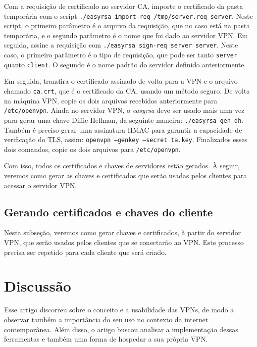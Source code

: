 \documentclass[12pt]{article}
\begin{document}
\begin{flushleft}
Com a requisição de certificado no servidor CA, importe o certificado da pasta temporária com o script 
\texttt{./easyrsa import-req /tmp/server.req server}. Neste script, o primeiro parâmetro é o arquivo da requisição,
que no caso está na pasta temporária, e o segundo parâmetro é o nome que foi dado ao servidor VPN. Em seguida,
assine a requisição com \texttt{./easyrsa sign-req server server}. Neste caso, o primeiro parâmetro é o tipo de 
requisição, que pode ser tanto \texttt{server} quanto \texttt{client}. O segundo é o nome padrão do servidor definido anteriormente.

Em seguida, transfira o certificado assinado de volta para a VPN e o arquivo chamado
\texttt{ca.crt}, que é o certificado da CA, usando um método seguro. De volta na máquina VPN, copie os dois arquivos recebidos 
anteriormente para \texttt{/etc/openvpn}. Ainda no servidor VPN, o \emph{easyrsa} deve ser usado mais uma vez para
gerar uma chave Diffie-Hellman, da seguinte maneira: \texttt{./easyrsa gen-dh}. Também é preciso gerar uma
assinatura HMAC para garantir a capacidade de verificação do TLS, assim: \texttt{openvpn --genkey --secret ta.key}.
Finalizados esses dois comandos, copie os dois arquivos para \texttt{/etc/openvpn}. 

Com isso, todos os certificados e chaves de servidores estão gerados. À seguir, veremos como gerar as chaves 
e certificados que serão usadas pelos clientes para acessar o servidor VPN.


\subsection{Gerando certificados e chaves do cliente}

Nesta subseção, veremos como gerar chaves e certificados, à partir do servidor VPN, que serão usados
pelos clientes que se conectarão ao VPN. Este processo precisa ser repetido para cada cliente que será criado.


\section{Discussão}

Esse artigo discorreu sobre o conceito e a usabilidade das VPNs, de modo a observar também a importância
do seu uso no contexto da internet contemporânea. Além disso, o artigo buscou analisar a implementação
dessas ferramentas e também uma forma de hospedar a sua própria VPN.


\end{flushleft}
\end{document}
